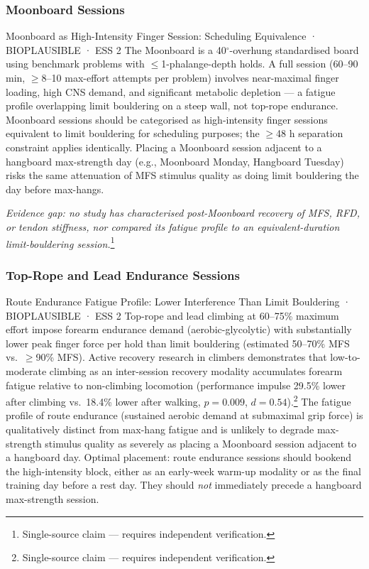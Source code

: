\subsubsection*{Moonboard Sessions}

\begin{bioplausbox}{Moonboard as High-Intensity Finger Session: Scheduling Equivalence · BIOPLAUSIBLE · ESS 2}
The Moonboard is a 40$^\circ$-overhung standardised board using benchmark problems with $\leq$1-phalange-depth holds. A full session (60–90 min, $\geq$8–10 max-effort attempts per problem) involves near-maximal finger loading, high CNS demand, and significant metabolic depletion — a fatigue profile overlapping limit bouldering on a steep wall, not top-rope endurance. Moonboard sessions should be categorised as high-intensity finger sessions equivalent to limit bouldering for scheduling purposes; the $\geq$48 h separation constraint applies identically. Placing a Moonboard session adjacent to a hangboard max-strength day (e.g., Moonboard Monday, Hangboard Tuesday) risks the same attenuation of MFS stimulus quality as doing limit bouldering the day before max-hangs.

\textit{Evidence gap: no study has characterised post-Moonboard recovery of MFS, RFD, or tendon stiffness, nor compared its fatigue profile to an equivalent-duration limit-bouldering session.}\footnote{Single-source claim — requires independent verification.}
\end{bioplausbox}

\subsubsection*{Top-Rope and Lead Endurance Sessions}

\begin{bioplausbox}{Route Endurance Fatigue Profile: Lower Interference Than Limit Bouldering · BIOPLAUSIBLE · ESS 2}
Top-rope and lead climbing at 60–75\% maximum effort impose forearm endurance demand (aerobic-glycolytic) with substantially lower peak finger force per hold than limit bouldering (estimated 50–70\% MFS vs.\ $\geq$90\% MFS). Active recovery research in climbers demonstrates that low-to-moderate climbing as an inter-session recovery modality accumulates forearm fatigue relative to non-climbing locomotion (performance impulse 29.5\% lower after climbing vs.\ 18.4\% lower after walking, $p = 0.009$, $d = 0.54$).\footnote{Single-source claim — requires independent verification.} The fatigue profile of route endurance (sustained aerobic demand at submaximal grip force) is qualitatively distinct from max-hang fatigue and is unlikely to degrade max-strength stimulus quality as severely as placing a Moonboard session adjacent to a hangboard day. Optimal placement: route endurance sessions should bookend the high-intensity block, either as an early-week warm-up modality or as the final training day before a rest day. They should \emph{not} immediately precede a hangboard max-strength session.
\end{bioplausbox}

